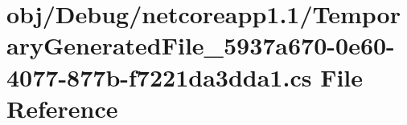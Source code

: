 \hypertarget{_debug_2netcoreapp1_81_2_temporary_generated_file__5937a670-0e60-4077-877b-f7221da3dda1_8cs}{}\section{obj/\+Debug/netcoreapp1.1/\+Temporary\+Generated\+File\+\_\+5937a670-\/0e60-\/4077-\/877b-\/f7221da3dda1.cs File Reference}
\label{_debug_2netcoreapp1_81_2_temporary_generated_file__5937a670-0e60-4077-877b-f7221da3dda1_8cs}
